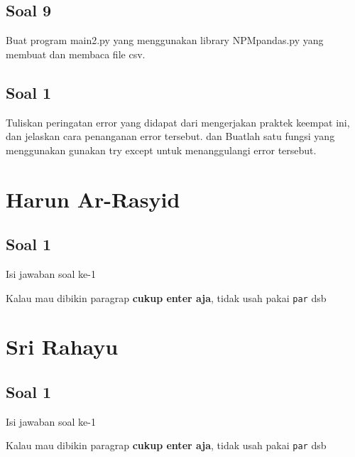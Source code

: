 \subsection{Soal 9}
Buat program main2.py yang menggunakan library NPMpandas.py yang membuat dan membaca file csv.



\subsection{Soal 1}
Tuliskan  peringatan  error  yang  didapat  dari  mengerjakan  praktek  keempat  ini, dan  jelaskan  cara  penanganan  error  tersebut.   dan  Buatlah  satu  fungsi  yang menggunakan gunakan try except untuk menanggulangi error tersebut.



\section{Harun Ar-Rasyid}
\subsection{Soal 1}
Isi jawaban soal ke-1

Kalau mau dibikin paragrap \textbf{cukup enter aja}, tidak usah pakai \verb|par| dsb



\section{Sri Rahayu}
\subsection{Soal 1}
Isi jawaban soal ke-1

Kalau mau dibikin paragrap \textbf{cukup enter aja}, tidak usah pakai \verb|par| dsb

